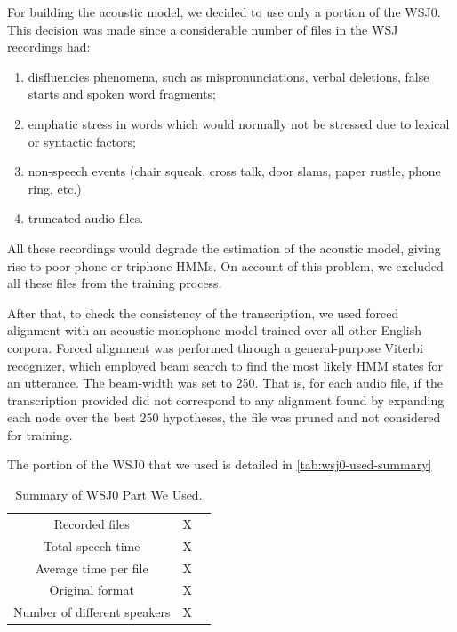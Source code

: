 For building the acoustic model, we decided to use only a portion of the WSJ0. This decision was made 
since a considerable number of files in the WSJ recordings had:

\begin{enumerate}
 \item disfluencies phenomena, such as mispronunciations, verbal deletions, false starts and spoken word fragments; 
 \item emphatic stress in words which would normally not be stressed due to lexical or syntactic factors;
 \item non-speech events (chair squeak, cross talk, door slams, paper rustle, phone ring, etc.)
 \item truncated audio files.
\end{enumerate}

All these recordings would degrade the estimation of the acoustic model, giving rise to poor phone or 
triphone \ac{HMM}s. On account of this problem, we excluded all these files from the training process.

After that, to check the consistency of the transcription, we used forced alignment with an acoustic
monophone model trained over all other English corpora. Forced alignment was performed through 
a general-purpose Viterbi recognizer, which employed beam search to find the most likely \ac{HMM} states 
for an utterance. The beam-width was set to 250. That is, for each audio file, if the transcription provided 
did not correspond to any alignment found by expanding each node over the best 250 hypotheses, 
the file was pruned and not considered for training.




The portion of the WSJ0 that we used is detailed in \autoref{tab:wsj0-used-summary}

\begin{table}[H]
\caption[Summary of WSJ0 Part We Used.]{Summary of WSJ0 Part We Used.}
\smallskip
\centering
\begin{tabular}{ccc} \toprule
  Recorded files & X \\
  Total speech time & X \\
  Average time per file & X \\
  Original format & X \\
  Number of different speakers & X \\
  \bottomrule
\end{tabular}
\label{tab:wsj0-used-summary}
\end{table}

